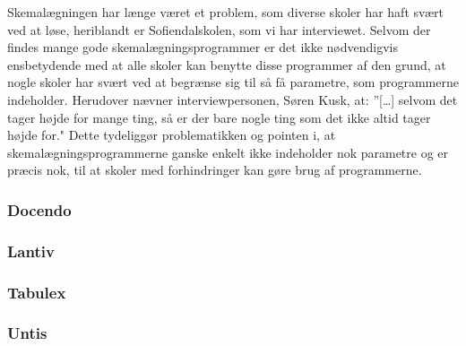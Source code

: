 Skemalægningen har længe været et problem, som diverse skoler har haft svært ved at løse, heriblandt er Sofiendalskolen, som vi har interviewet.
Selvom der findes mange gode skemalægningsprogrammer er det ikke nødvendigvis ensbetydende med at alle skoler kan benytte disse programmer af den grund, at nogle skoler har svært ved at begrænse sig til så få parametre, som programmerne indeholder. Herudover nævner interviewpersonen, Søren Kusk, at: ”[…] selvom det tager højde for mange ting, så er der bare nogle ting som det ikke altid tager højde for." Dette tydeliggør problematikken og pointen i, at skemalægningsprogrammerne ganske enkelt ikke indeholder nok parametre og er præcis nok, til at skoler med forhindringer kan gøre brug af programmerne. 

  \subsubsection{Docendo}
    

  \subsubsection{Lantiv}
    

  \subsubsection{Tabulex}
    

  \subsubsection{Untis}
    